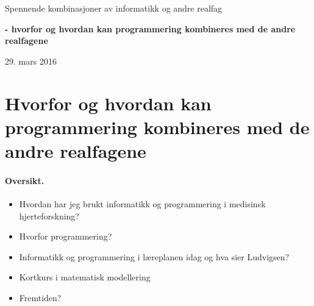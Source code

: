 \documentclass[%
oneside,                 %
final,                   %
10pt]{article}
\begin{document}






\thispagestyle{empty}

\begin{center}
{\LARGE\bf
\begin{spacing}{1.25}
Spennende kombinasjoner av informatikk og andre realfag
\end{spacing}
}
\end{center}


\begin{center}
{\bf - hvorfor og hvordan kan programmering kombineres med de andre realfagene${}^{}$} \\ [0mm]
\end{center}

\begin{center}
\end{center}
    

\begin{center}
29. mars 2016
\end{center}

\vspace{1cm}



\section{Hvorfor og hvordan kan programmering kombineres med de andre realfagene}

\paragraph{Oversikt.}
\begin{itemize}
\item Hvordan har jeg brukt informatikk og programmering i medisinsk hjerteforskning?

\item Hvorfor programmering?

\item Informatikk og programmering i læreplanen idag og hva sier Ludvigsen?

\item Kortkurs i matematisk modellering

\item Fremtiden?
\end{itemize}
\end{document}
